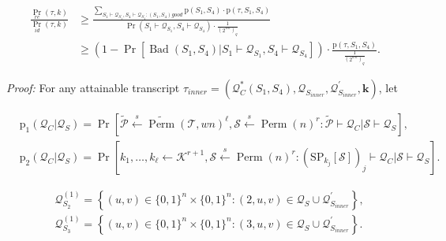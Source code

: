 \begin{equation}
\begin{aligned}
\frac{\operatorname{Pr}_{r e}(\tau, k)}{\operatorname{Pr}_{i d}(\tau, k)} &\geq \frac{\sum_{S_{1} \vdash \mathcal{Q}_{S_{1}}, S_{4} \vdash \mathcal{Q}_{S_{4}}: \left(S_{1}, S_{4}\right)good } \mathrm{p}\left(S_{1}, S_{4}\right) \cdot \mathrm{p}\left(\tau, S_{1}, S_{4}\right)}{\operatorname{Pr}(S_{1} \vdash \mathcal{Q}_{S_{1}}, S_{4} \vdash \mathcal{Q}_{S_{4}}) \cdot \frac{1}{\left(2^{w n}\right)_{q}}}\\
&\geq \left(1-\operatorname{Pr}\left[\operatorname{Bad}\left(S_{1},S_{4}\right) | S_{1} \vdash \mathcal{Q}_{S_{1}}, S_{4} \vdash \mathcal{Q}_{S_{4}}\right]\right) \cdot
\frac{\mathrm{p}\left(\tau, S_{1}, S_{4}\right)}{\frac{1}{\left(2^{w n}\right)_{q}}}.
\end{aligned}
\end{equation}

\noindent \emph{Proof:} For any attainable transcript $\tau_{inner}=\left(\mathcal{Q}_{C}^{*}\left(S_{1},S_{4}\right), \mathcal{Q}_{S_{inner}}, \mathcal{Q}_{S_{inner}}^{\prime}, \mathbf{k}\right)$, let

$$
\begin{aligned}
&\mathrm{p}_{1}\left(\mathcal{Q}_{C} | \mathcal{Q}_{S}\right)=\operatorname{Pr}\left[\widetilde{\mathcal{P}} \stackrel{s}{\leftarrow} \widetilde{\operatorname{Perm}}(\mathcal{T}, w n)^{\ell}, \mathcal{S} \stackrel{s}{\leftarrow} \operatorname{Perm}(n)^{r}: \tilde{\mathcal{P}} \vdash \mathcal{Q}_{C} | \mathcal{S} \vdash \mathcal{Q}_{S}\right],\\
&\mathrm{p}_{2}\left(\mathcal{Q}_{C} | \mathcal{Q}_{S}\right)=\operatorname{Pr}\left[k_{1}, \ldots, k_{\ell} \leftarrow \mathcal{K}^{r+1}, \mathcal{S} \stackrel{s}{\leftarrow} \operatorname{Perm}(n)^{r}:\left(\mathrm{SP}_{k_{j}}[\mathcal{S}]\right)_{j} \vdash \mathcal{Q}_{C} | \mathcal{S} \vdash \mathcal{Q}_{S}\right].
\end{aligned}
$$

$$
\begin{aligned}
&\mathcal{Q}_{S_{2}}^{(1)}=\left\{(u, v) \in\{0,1\}^{n} \times\{0,1\}^{n}:(2, u, v) \in \mathcal{Q}_{S} \cup \mathcal{Q}_{S_{inner}}^{\prime}\right\},\\
&\mathcal{Q}_{S_{3}}^{(1)}=\left\{(u, v) \in\{0,1\}^{n} \times\{0,1\}^{n}:(3, u, v) \in \mathcal{Q}_{S} \cup \mathcal{Q}_{S_{inner}}^{\prime}\right\}.\\
\end{aligned}
$$

